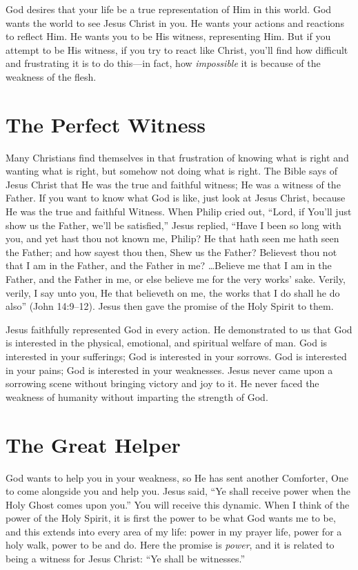 God desires that your life be a true representation of
Him in this world. God wants the world to see Jesus Christ
in you. He wants your actions and reactions to reflect Him.
He wants you to be His witness, representing Him. But if
you attempt to be His witness, if you try to react like Christ,
you’ll find how difficult and frustrating it is to do this—in
fact, how \emph{impossible} it is because of the weakness of the
flesh.


\section*{The Perfect Witness}

Many Christians find themselves in that frustration of
knowing what is right and wanting what is right, but somehow
not doing what is right. The Bible says of Jesus Christ
that He was the true and faithful witness; He was a witness
of the Father. If you want to know what God is like, just look
at Jesus Christ, because He was the true and faithful Witness.
When Philip cried out, “Lord, if You’ll just show us
the Father, we’ll be satisfied,” Jesus replied, “Have I been so
long with you, and yet hast thou not known me, Philip? He
that hath seen me hath seen the Father; and how sayest thou
then, Shew us the Father? Believest thou not that I am in the
Father, and the Father in me? …Believe me that I am in the
Father, and the Father in me, or else believe me for the very
works’ sake. Verily, verily, I say unto you, He that believeth
on me, the works that I do shall he do also” (John 14:9–12).
Jesus then gave the promise of the Holy Spirit to them.

Jesus faithfully represented God in every action. He
demonstrated to us that God is interested in the physical,
emotional, and spiritual welfare of man. God is interested
in your sufferings; God is interested in your sorrows. God
is interested in your pains; God is interested in your weaknesses.
Jesus never came upon a sorrowing scene without
bringing victory and joy to it. He never faced the weakness
of humanity without imparting the strength of God.


\section*{The Great Helper}

God wants to help you in your weakness, so He has
sent another Comforter, One to come alongside you and
help you. Jesus said, “Ye shall receive power when the Holy
Ghost comes upon you.” You will receive this dynamic.
When I think of the power of the Holy Spirit, it is first the
power to be what God wants me to be, and this extends into
every area of my life: power in my prayer life, power for a
holy walk, power to be and do. Here the promise is \emph{power},
and it is related to being a witness for Jesus Christ: “Ye shall
be witnesses.”

